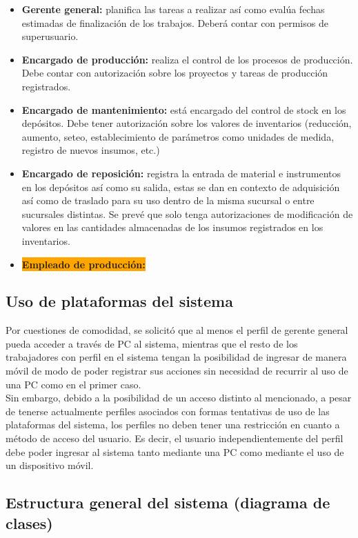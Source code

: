 \documentclass[a4paper, 12pt,twoside]{report}  %
\numberwithin{equation}{subsection} %
\begin{document}
\begin{itemize}
\item \textbf{Gerente general:} planifica las tareas a realizar así como evalúa fechas estimadas de finalización de los trabajos. Deberá contar con permisos de superusuario.
\item \textbf{Encargado de producción:} realiza el control de los procesos de producción. Debe contar con autorización sobre los proyectos y tareas de producción registrados.
\item \textbf{Encargado de mantenimiento:} está encargado del control de stock en los depósitos. Debe tener autorización sobre los valores de inventarios (reducción, aumento, seteo, establecimiento de parámetros como unidades de medida, registro de nuevos insumos, etc.)
\item \textbf{Encargado de reposición:} registra la entrada de material e instrumentos en los depósitos así como su salida, estas se dan en contexto de adquisición así como de traslado para su uso dentro de la misma sucursal o entre sucursales distintas. Se prevé que solo tenga autorizaciones de modificación de valores en las cantidades almacenadas de los insumos registrados en los inventarios.
\item \colorbox{orange}{\textbf{Empleado de producción:}}\\
\end{itemize}

\subsection{Uso de plataformas del sistema} Por cuestiones de comodidad, se solicitó que al menos el perfil de gerente general pueda acceder a través de PC al sistema, mientras que el resto de los trabajadores con perfil en el sistema tengan la posibilidad de ingresar de manera móvil de modo de poder registrar sus acciones sin necesidad de recurrir al uso de una PC como en el primer caso.\\
\indent Sin embargo, debido a la posibilidad de un acceso distinto al mencionado, a pesar de tenerse actualmente perfiles asociados con formas tentativas de uso de las plataformas del sistema, los perfiles no deben tener una restricción en cuanto a método de acceso del usuario. Es decir, el usuario independientemente del perfil debe poder ingresar al sistema tanto mediante una PC como mediante el uso de un dispositivo móvil.

\subsection{Estructura general del sistema (diagrama de clases)}
\end{document}

